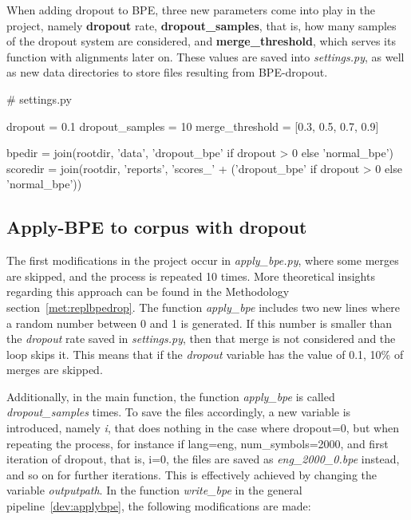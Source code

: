 When adding dropout to BPE, three new parameters come into play in the project, namely \textbf{dropout} rate, \textbf{dropout\_samples}, that is, how many samples of the dropout system are considered, and \textbf{merge\_threshold}, which serves its function with alignments later on. These values are saved into \emph{settings.py}, as well as new data directories to store files resulting from BPE-dropout.

\begin{python}
# settings.py

dropout = 0.1
dropout_samples = 10
merge_threshold = [0.3, 0.5, 0.7, 0.9]

bpedir = join(rootdir, 'data', 'dropout_bpe' if dropout > 0 else 'normal_bpe')
scoredir = join(rootdir, 'reports', 'scores_' + ('dropout_bpe' if dropout > 0 else 'normal_bpe'))
\end{python}

\subsection{Apply-BPE to corpus with dropout}

The first modifications in the project occur in \emph{apply\_bpe.py}, where some merges are skipped, and the process is repeated 10 times. More theoretical insights regarding this approach can be found in the Methodology section~\ref{met:replbpedrop}. The function \emph{apply\_bpe} includes two new lines where a random number between 0 and 1 is generated. If this number is smaller than the \emph{dropout} rate saved in \emph{settings.py}, then that merge is not considered and the loop skips it. This means that if the \emph{dropout} variable has the value of 0.1, 10\% of merges are skipped.

Additionally, in the main function, the function \emph{apply\_bpe} is called \emph{dropout\_samples} times. To save the files accordingly, a new variable is introduced, namely \emph{i}, that does nothing in the case where dropout=0, but when repeating the process, for instance if lang=eng, num\_symbols=2000, and first iteration of dropout, that is, i=0, the files are saved as \emph{eng\_2000\_0.bpe} instead, and so on for further iterations. This is effectively achieved by changing the variable \emph{outputpath}. In the function \emph{write\_bpe} in the general pipeline~\ref{dev:applybpe}, the following modifications are made:

